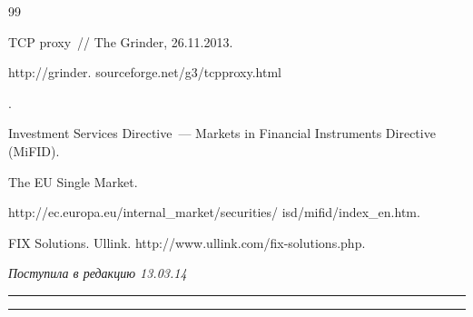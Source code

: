 {{\begin{thebibliography}{99}


 TCP proxy~/\!\!/ The Grinder, 26.11.2013. {\sf


http://grinder. sourceforge.net/g3/tcpproxy.html}.







Investment Services Directive~--- Markets in Financial Instruments Directive (MiFID).


The EU Single Market.


{\sf http://ec.europa.eu/internal\_market/securities/ isd/mifid/index\_en.htm}.







FIX Solutions. Ullink. {\sf http://www.ullink.com/fix-solutions.php}.





\end{thebibliography}


}


}





\vspace*{-6pt}





\hfill{\small\textit{Поступила в редакцию 13.03.14}}








\vspace*{12pt}





\hrule





\vspace*{2pt}





\hrule





\def\tit{USAGE OF PASSIVE TESTING TOOLS FOR~CERTIFICATION


OF~TRADING SYSTEMS CLIENTS}





